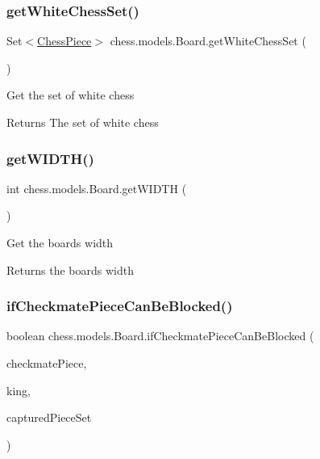 \subsubsection{\texorpdfstring{get\+White\+Chess\+Set()}{getWhiteChessSet()}}
{\footnotesize\ttfamily Set$<$\mbox{\hyperlink{classchess_1_1models_1_1_chess_piece}{Chess\+Piece}}$>$ chess.\+models.\+Board.\+get\+White\+Chess\+Set (\begin{DoxyParamCaption}{ }\end{DoxyParamCaption})}

Get the set of white chess

\begin{DoxyReturn}{Returns}
The set of white chess 
\end{DoxyReturn}
\mbox{\label{classchess_1_1models_1_1_board_aeab935c6befad60e51084a78458ebf39}} 
\subsubsection{\texorpdfstring{get\+W\+I\+D\+T\+H()}{getWIDTH()}}
{\footnotesize\ttfamily int chess.\+models.\+Board.\+get\+W\+I\+D\+TH (\begin{DoxyParamCaption}{ }\end{DoxyParamCaption})}

Get the board\textquotesingle{}s width

\begin{DoxyReturn}{Returns}
the board\textquotesingle{}s width 
\end{DoxyReturn}
\mbox{\label{classchess_1_1models_1_1_board_a59a36d62ed2b4ef22b14fda1c10968d8}} 
\subsubsection{\texorpdfstring{if\+Checkmate\+Piece\+Can\+Be\+Blocked()}{ifCheckmatePieceCanBeBlocked()}}
{\footnotesize\ttfamily boolean chess.\+models.\+Board.\+if\+Checkmate\+Piece\+Can\+Be\+Blocked (\begin{DoxyParamCaption}\item[{\mbox{\hyperlink{classchess_1_1models_1_1_chess_piece}{Chess\+Piece}}}]{checkmate\+Piece,  }\item[{\mbox{\hyperlink{classchess_1_1models_1_1_chess_piece}{Chess\+Piece}}}]{king,  }\item[{Set$<$ \mbox{\hyperlink{classchess_1_1models_1_1_chess_piece}{Chess\+Piece}} $>$}]{captured\+Piece\+Set }\end{DoxyParamCaption})}

